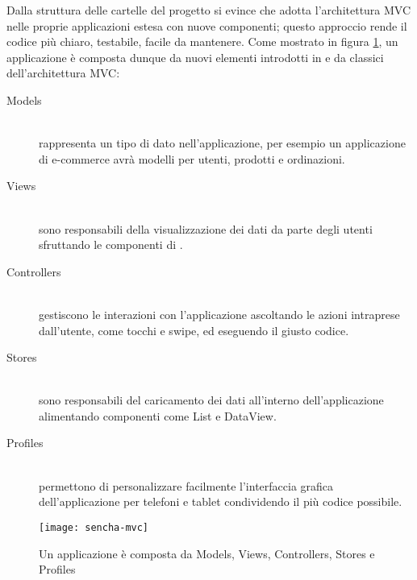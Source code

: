 			Dalla struttura delle cartelle del progetto si evince che \senchat{} adotta
			l'architettura MVC nelle proprie applicazioni estesa con nuove componenti;
			questo approccio rende il codice più chiaro, testabile, facile da mantenere.
			Come mostrato in figura	\ref{fig:sencha_mvc}, un applicazione è
			composta dunque da nuovi elementi introdotti in \senchat{} e da
			classici dell'architettura MVC:
			\begin{description}
				\item[Models]\hfill \\
					rappresenta un tipo di dato nell'applicazione, per esempio un
					applicazione di e-commerce avrà modelli per utenti, prodotti
					e ordinazioni.
				\item[Views]\hfill \\
					sono responsabili della visualizzazione dei dati da parte
					degli utenti sfruttando le componenti di \senchat{}.
				\item[Controllers]\hfill \\
					gestiscono le interazioni con l'applicazione ascoltando le
					azioni intraprese dall'utente, come tocchi e swipe, ed eseguendo
					il giusto codice.
				\item[Stores]\hfill \\
					sono responsabili del caricamento dei dati all'interno
					dell'applicazione alimentando componenti come List e DataView.
				\item[Profiles]\hfill \\
					permettono di personalizzare facilmente l'interfaccia grafica
					dell'applicazione per telefoni e tablet condividendo il più
					codice possibile.
			\end{description}
			\begin{figure}[h]
				\centering
				\texttt{[image: sencha-mvc]}
				\caption{
					Un applicazione \senchat{} è composta da Models, Views,
					Controllers, Stores e Profiles
				}
				\label{fig:sencha_mvc}
			\end{figure}
			
